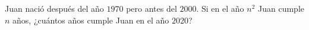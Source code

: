 Juan nació después del año $1970$ pero antes del $2000$. Si en el año $n^2$ Juan cumple $n$ años, ¿cuántos años cumple Juan en el año $2020$?